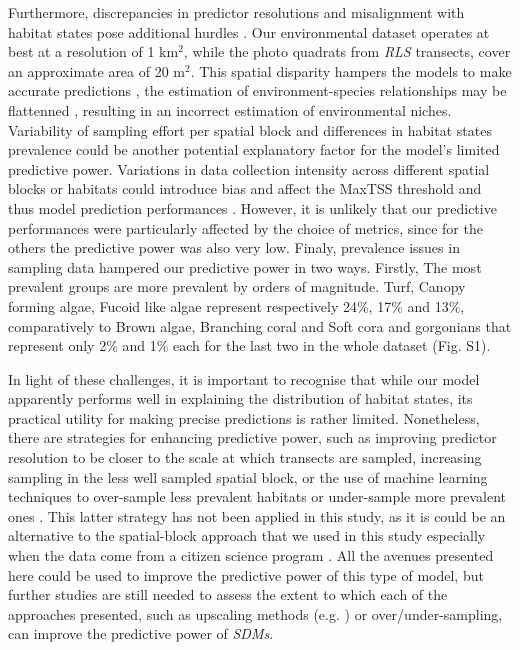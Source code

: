 \begin{refsection}
Furthermore, discrepancies in predictor resolutions and misalignment
with habitat states pose additional hurdles \autocite{Potter_2013}. Our
environmental dataset operates at best at a resolution of 1 km\(^2\),
while the photo quadrats from \emph{RLS} transects, cover an approximate
area of 20 m\(^2\). This spatial disparity hampers the models to make
accurate predictions \autocites[ ]{Connor_2018}{Moudry_2023}, the
estimation of environment-species relationships may be flattenned
\autocite{Meynard_2023}, resulting in an incorrect estimation of
environmental niches. Variability of sampling effort per spatial block
and differences in habitat states prevalence could be another potential
explanatory factor for the model's limited predictive power. Variations
in data collection intensity across different spatial blocks or habitats
could introduce bias and affect the MaxTSS threshold and thus model
prediction performances \autocites[ ]{Somodi_2017}{Leroy_2018}. However,
it is unlikely that our predictive performances were particularly
affected by the choice of metrics, since for the others the predictive
power was also very low. Finaly, prevalence issues in sampling data
hampered our predictive power in two ways. Firstly, The most prevalent
groups are more prevalent by orders of magnitude. Turf, Canopy forming
algae, Fucoid like algae represent respectively 24\%, 17\% and 13\%,
comparatively to Brown algae, Branching coral and Soft cora and
gorgonians that represent only 2\% and 1\% each for the last two in the
whole dataset (Fig. S1).

In light of these challenges, it is important to recognise that while
our model apparently performs well in explaining the distribution of
habitat states, its practical utility for making precise predictions is
rather limited. Nonetheless, there are strategies for enhancing
predictive power, such as improving predictor resolution to be closer to
the scale at which transects are sampled, increasing sampling in the
less well sampled spatial block, or the use of machine learning
techniques to over-sample less prevalent habitats or under-sample more
prevalent ones \autocite{He_2009}. This latter strategy has not been
applied in this study, as it is could be an alternative to the
spatial-block approach that we used in this study \autocite{Gaul_2022}
especially when the data come from a citizen science program \autocites[
]{Robinson_2018}{Robinson_2020}. All the avenues presented here could be
used to improve the predictive power of this type of model, but further
studies are still needed to assess the extent to which each of the
approaches presented, such as upscaling methods (e.g.
\textcite{Meynard_2023}) or over/under-sampling, can improve the
predictive power of \emph{SDMs}.


\end{refsection}

